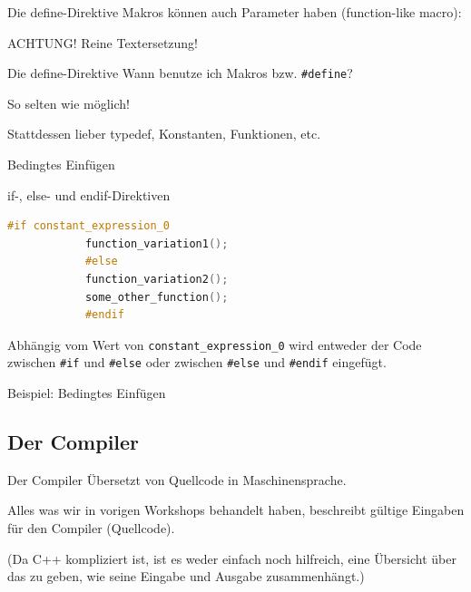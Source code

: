 \begin{frame}[fragile]{Die define-Direktive}
	Makros können auch Parameter haben (function-like macro):
	\vspace{1em}
	
	\footnotesize
	{%
		
	}{%
		
	}
	
	\alert{ACHTUNG! Reine Textersetzung!}
\end{frame}

\begin{frame}[fragile]{Die define-Direktive}
	Wann benutze ich Makros bzw. \verb|#define|?
	
	\vspace{2em}
	{
		\alert{So selten wie möglich!}
		
		Stattdessen lieber typedef, Konstanten, Funktionen, etc.
	}
\end{frame}

\begin{frame}[fragile]{Bedingtes Einfügen}
	\begin{block}{if-, else- und endif-Direktiven}
		\begin{lstlisting}[language=C++]
			#if constant_expression_0
			function_variation1();
			#else
			function_variation2();
			some_other_function();
			#endif
		\end{lstlisting}
		Abhängig vom Wert von \verb|constant_expression_0| wird entweder der Code zwischen \verb|#if| und \verb|#else| oder zwischen \verb|#else| und \verb|#endif| eingefügt.
	\end{block}
\end{frame}

\begin{frame}[t]{Beispiel: Bedingtes Einfügen}
	\footnotesize
	\only<1>{
		
	}
	\only<2>{
		
	}
	\only<3>{
		
	}
\end{frame}


\subsection{Der Compiler}
\begin{frame}[fragile]{Der Compiler}
	Übersetzt von Quellcode in Maschinensprache.
	
	\vspace{1em}
	
	Alles was wir in vorigen Workshops behandelt haben, beschreibt gültige Eingaben für den Compiler (Quellcode).
	
	\vspace{2em}
	
	{\footnotesize (Da C++ kompliziert ist, ist es weder einfach noch hilfreich, eine Übersicht über das zu geben, wie seine Eingabe und Ausgabe zusammenhängt.) }
\end{frame}


